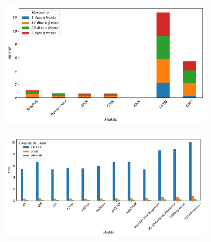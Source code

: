 \begin{figure}[!htb]
	\centering
	\caption{Análise comparativa dos modelos utilizando gráfico de barras \label{fig:rrmse_comparar} \label{fig:basic_comparar}}
	\begin{subfigure}{1\textwidth}
		\includegraphics[width=\linewidth]{Resultados/Figuras/rrmse_comparar}
	
		
	\end{subfigure}
	
	\begin{subfigure}{1\textwidth}
		\includegraphics[width=\linewidth]{Resultados/Figuras/basic_comparar}
		
		
	\end{subfigure}
	

\end{figure}

